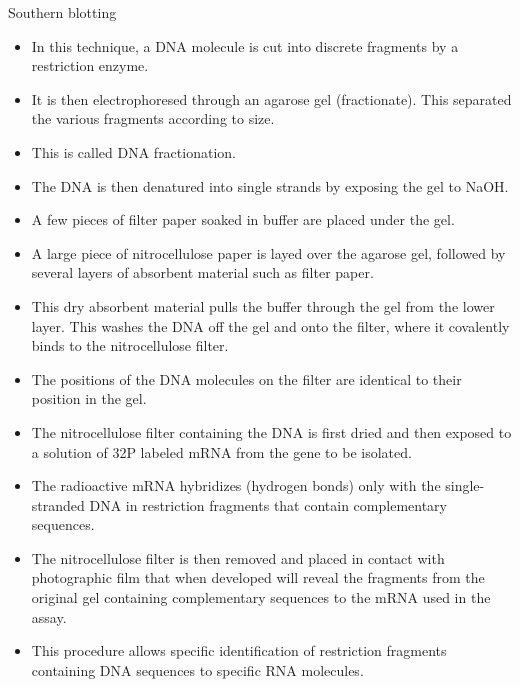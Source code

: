 \documentclass[11pt,dvipsnames,ignorenonframetext,aspectratio=169]{beamer}
\providecommand{\tightlist}{%
  \setlength{\itemsep}{0pt}\setlength{\parskip}{0pt}}
\begin{document}
\begin{frame}{Southern blotting}
\protect\hypertarget{southern-blotting}{}
\begin{itemize}
\tightlist
\item
  In this technique, a DNA molecule is cut into discrete fragments by a
  restriction enzyme.
\item
  It is then electrophoresed through an agarose gel (fractionate). This
  separated the various fragments according to size.
\item
  This is called DNA fractionation.
\item
  The DNA is then denatured into single strands by exposing the gel to
  NaOH.
\item
  A few pieces of filter paper soaked in buffer are placed under the
  gel.
\item
  A large piece of nitrocellulose paper is layed over the agarose gel,
  followed by several layers of absorbent material such as filter paper.
\item
  This dry absorbent material pulls the buffer through the gel from the
  lower layer. This washes the DNA off the gel and onto the filter,
  where it covalently binds to the nitrocellulose filter.
\end{itemize}
\end{frame}

\begin{frame}{}
\protect\hypertarget{section-29}{}
\begin{itemize}
\tightlist
\item
  The positions of the DNA molecules on the filter are identical to
  their position in the gel.
\item
  The nitrocellulose filter containing the DNA is first dried and then
  exposed to a solution of 32P labeled mRNA from the gene to be
  isolated.
\item
  The radioactive mRNA hybridizes (hydrogen bonds) only with the
  single-stranded DNA in restriction fragments that contain
  complementary sequences.
\item
  The nitrocellulose filter is then removed and placed in contact with
  photographic film that when developed will reveal the fragments from
  the original gel containing complementary sequences to the mRNA used
  in the assay.
\item
  This procedure allows specific identification of restriction fragments
  containing DNA sequences to specific RNA molecules.
\end{itemize}
\end{frame}
\end{document}
